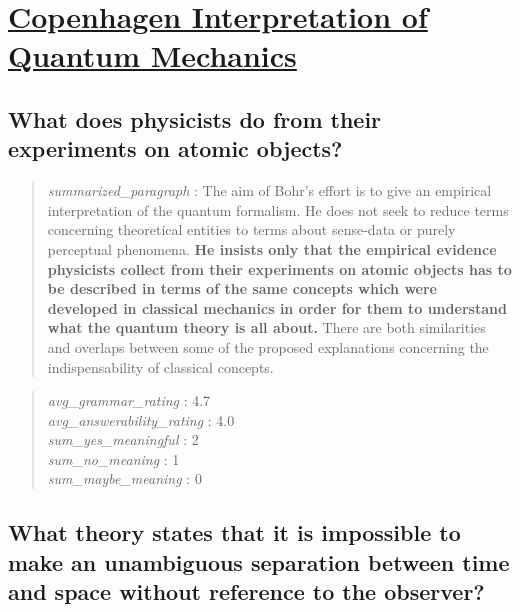 \hypertarget{copenhagen-interpretation-of-quantum-mechanics}{%
\section{\texorpdfstring{\href{https://plato.stanford.edu/entries/qm-copenhagen/index.html}{Copenhagen
Interpretation of Quantum
Mechanics}}{Copenhagen Interpretation of Quantum Mechanics}}\label{copenhagen-interpretation-of-quantum-mechanics}}

\hypertarget{what-does-physicists-do-from-their-experiments-on-atomic-objects}{%
\subsection{What does physicists do from their experiments on atomic
objects?}\label{what-does-physicists-do-from-their-experiments-on-atomic-objects}}

\begin{quote}
\emph{summarized\_paragraph} : The aim of Bohr's effort is to give an
empirical interpretation of the quantum formalism. He does not seek to
reduce terms concerning theoretical entities to terms about sense-data
or purely perceptual phenomena. \textbf{He insists only that the
empirical evidence physicists collect from their experiments on atomic
objects has to be described in terms of the same concepts which were
developed in classical mechanics in order for them to understand what
the quantum theory is all about.} There are both similarities and
overlaps between some of the proposed explanations concerning the
indispensability of classical concepts.
\end{quote}

\begin{quote}
\emph{avg\_grammar\_rating} : 4.7\\
\emph{avg\_answerability\_rating} : 4.0\\
\emph{sum\_yes\_meaningful} : 2\\
\emph{sum\_no\_meaning} : 1\\
\emph{sum\_maybe\_meaning} : 0
\end{quote}

\hypertarget{what-theory-states-that-it-is-impossible-to-make-an-unambiguous-separation-between-time-and-space-without-reference-to-the-observer}{%
\subsection{What theory states that it is impossible to make an
unambiguous separation between time and space without reference to the
observer?}\label{what-theory-states-that-it-is-impossible-to-make-an-unambiguous-separation-between-time-and-space-without-reference-to-the-observer}}

